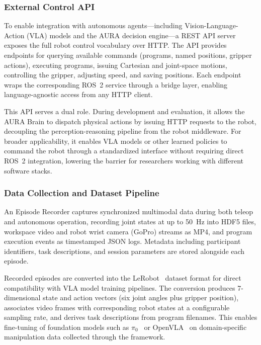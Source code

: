 \documentclass[sensors,article,submit,pdftex,moreauthors]{Definitions/mdpi}
\begin{document}
\subsubsection{External Control API}

To enable integration with autonomous agents---including Vision-Language-Action (VLA) models and the AURA decision engine---a REST API server exposes the full robot control vocabulary over HTTP. The API provides endpoints for querying available commands (programs, named positions, gripper actions), executing programs, issuing Cartesian and joint-space motions, controlling the gripper, adjusting speed, and saving positions. Each endpoint wraps the corresponding ROS~2 service through a bridge layer, enabling language-agnostic access from any HTTP client.

This API serves a dual role. During development and evaluation, it allows the AURA Brain to dispatch physical actions by issuing HTTP requests to the robot, decoupling the perception-reasoning pipeline from the robot middleware. For broader applicability, it enables VLA models or other learned policies to command the robot through a standardized interface without requiring direct ROS~2 integration, lowering the barrier for researchers working with different software stacks.

\subsubsection{Data Collection and Dataset Pipeline}

An Episode Recorder captures synchronized multimodal data during both teleop and autonomous operation, recording joint states at up to 50~Hz into HDF5 files, workspace video and robot wrist camera (GoPro) streams as MP4, and program execution events as timestamped JSON logs. Metadata including participant identifiers, task descriptions, and session parameters are stored alongside each episode.

Recorded episodes are converted into the LeRobot~\cite{cadene2024lerobot} dataset format for direct compatibility with VLA model training pipelines. The conversion produces 7-dimensional state and action vectors (six joint angles plus gripper position), associates video frames with corresponding robot states at a configurable sampling rate, and derives task descriptions from program filenames. This enables fine-tuning of foundation models such as $\pi_0$~\cite{pi0} or OpenVLA~\cite{openvla} on domain-specific manipulation data collected through the framework.
\end{document}
